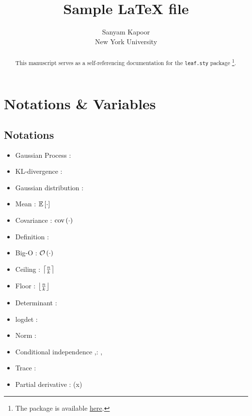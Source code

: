 \documentclass{article}
\begin{document}
\title{Sample \LaTeX{ }file}

\author{\name Sanyam Kapoor \\
        \addr New York University}


\maketitle

\begin{abstract}%
This manuscript serves as a self-referencing documentation for the \texttt{leaf.sty} package \footnote{The package is available \href{https://github.com/activatedgeek/latexfiles}{here}.}.
\end{abstract}


\section{Notations \& Variables}

\subsection{Notations}

\begin{itemize}
\item Gaussian Process \vrb{\gp{\cdot,\cdot}}: \gp{\cdot,\cdot}
\item KL-divergence \vrb{\kl}: \kl
\item Gaussian distribution \vrb{\gaussian{}}: \gaussian{\cdot, \cdot}
\item Mean \vrb{\mean{\cdot}}: $\mathbb{E}\left[\cdot\right]$
\item Covariance \vrb{\cov{\cdor}}: $\mathrm{cov}\left(\cdot\right)$
\item Definition : 
\item Big-O \vrb{\bigo{\cdot}}:  $\mathcal{O}\left(\cdot\right)$
\item Ceiling : $\left\lceil \tfrac{n}{k} \right\rceil$
\item Floor : $\left\lfloor \tfrac{n}{k} \right\rfloor$
\item Determinant \vrb{\determ{}}: \determ{\cdot}
\item logdet \vrb{\logdet{}}: \logdet{\cdot}
\item Norm \vrb{\norm{}}: \norm{\cdot}
\item Conditional independence \vrb{\ci},\vrb{\nci}: \ci, \nci
\item Trace \vrb{\tr{}}: \tr{\cdot}
\item Partial derivative \vrb{\pd{}{}}: (x)
\end{itemize}
\end{document}
